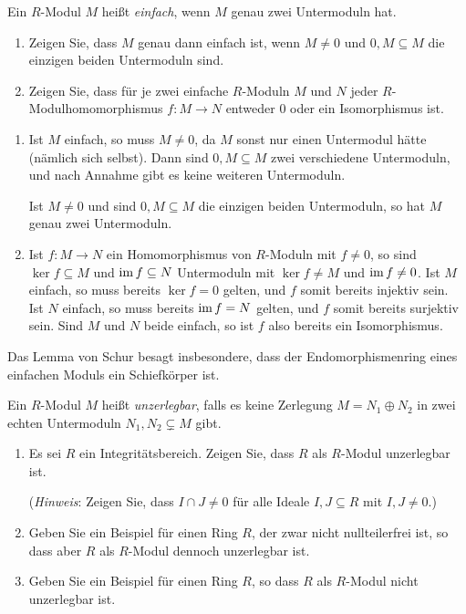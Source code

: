 \begin{question}[subtitle = Schurs Lemma]
  Ein $R$-Modul $M$ heißt \emph{einfach}, wenn $M$ genau zwei Untermoduln hat.
  \begin{enumerate}
    \item
      Zeigen Sie, dass $M$ genau dann einfach ist, wenn $M \neq 0$ und $0, M \subseteq M$ die einzigen beiden Untermoduln sind.
    \item
      Zeigen Sie, dass für je zwei einfache $R$-Moduln $M$ und $N$ jeder $R$-Mo\-dul\-ho\-mo\-mor\-phis\-mus $f \colon M \to N$ entweder $0$ oder ein Isomorphismus ist.
  \end{enumerate}
\end{question}


\begin{solution}
  \begin{enumerate}
    \item
      Ist $M$ einfach, so muss $M \neq 0$, da $M$ sonst nur einen Untermodul hätte (nämlich sich selbst).
      Dann sind $0, M \subseteq M$ zwei verschiedene Untermoduln, und nach Annahme gibt es keine weiteren Untermoduln.
      
      Ist $M \neq 0$ und sind $0, M \subseteq M$ die einzigen beiden Untermoduln, so hat $M$ genau zwei Untermoduln.
    \item
      Ist $f \colon M \to N$ ein Homomorphismus von $R$-Moduln mit $f \neq 0$, so sind $\ker f \subseteq M$ und $\operatorname{im} f \subseteq N$ Untermoduln mit $\ker f \neq M$ und $\operatorname{im} f \neq 0$.
      Ist $M$ einfach, so muss bereits $\ker f = 0$ gelten, und $f$ somit bereits injektiv sein.
      Ist $N$ einfach, so muss bereits $\operatorname{im} f = N$ gelten, und $f$ somit bereits surjektiv sein.
      Sind $M$ und $N$ beide einfach, so ist $f$ also bereits ein Isomorphismus.
  \end{enumerate}
\end{solution}


\begin{remark*}
  Das Lemma von Schur besagt insbesondere, dass der Endomorphismenring eines einfachen Moduls ein Schiefkörper ist.
\end{remark*}


\begin{question}
  Ein $R$-Modul $M$ heißt \emph{unzerlegbar}, falls es keine Zerlegung $M = N_1 \oplus N_2$ in zwei echten Untermoduln $N_1, N_2 \subsetneq M$ gibt.
  \begin{enumerate}
    \item
      Es sei $R$ ein Integritätsbereich.
      Zeigen Sie, dass $R$ als $R$-Modul unzerlegbar ist.
      
      (\emph{Hinweis}: Zeigen Sie, dass $I \cap J \neq 0$ für alle Ideale $I, J \subseteq R$ mit $I, J \neq 0$.)
    \item
      Geben Sie ein Beispiel für einen Ring $R$, der zwar nicht nullteilerfrei ist, so dass aber $R$ als $R$-Modul dennoch unzerlegbar ist.
    \item
      Geben Sie ein Beispiel für einen Ring $R$, so dass $R$ als $R$-Modul nicht unzerlegbar ist.
  \end{enumerate}
\end{question}


